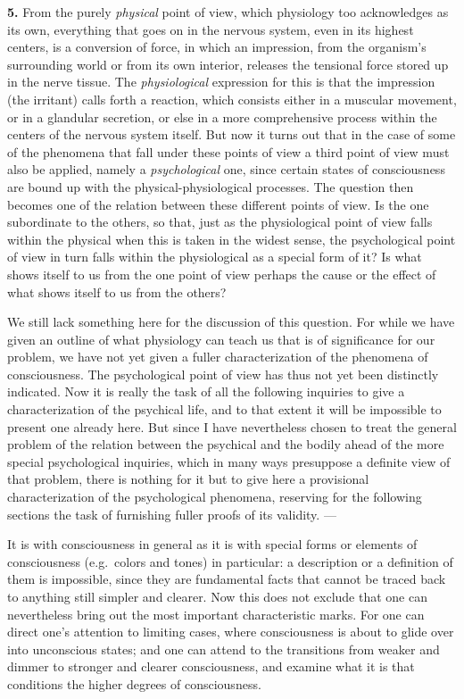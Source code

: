 \documentclass[12pt,a4paper]{book}
\newcommand{\opage}[1]{\marginnote{\footnotesize\textit{[#1]}}}
\begin{document}
\opage{54}\textbf{5.} From the purely \emph{physical} point of view,
which physiology too acknowledges as its own, everything that goes on in
the nervous system, even in its highest centers, is a conversion of
force, in which an impression, from the organism's surrounding world or
from its own interior, releases the tensional force stored up in the
nerve tissue. The \emph{physiological} expression for this is that the
impression (the irritant) calls forth a reaction, which consists either
in a muscular movement, or in a glandular secretion, or else in a more
comprehensive process within the centers of the nervous system itself.
But now it turns out that in the case of some of the phenomena that fall
under these points of view a third point of view must also be applied,
namely a \emph{psychological} one, since certain states of consciousness
are bound up with the physical-physiological processes. The question
then becomes one of the relation between these different points of
view. Is the one subordinate to the others, so that, just as the
physiological point of view falls within the physical when this is
taken in the widest sense, the psychological point of view in turn falls
within the physiological as a special form of it? Is what shows itself
to us from the one point of view perhaps the cause or the effect of what
shows itself to us from the others?

We still lack something here for the discussion of this question. For
while we have given an outline of what physiology can teach us that is
of significance for our problem, we have not yet given a fuller
characterization of the phenomena of consciousness. The psychological
point of view has thus not yet been distinctly indicated. Now it is
really the task of all the following inquiries to give a
characterization of the psychical life, and to that extent it will be
impossible to present one already here. But since I have nevertheless
chosen to treat the general problem of the relation between the
psychical and the bodily ahead of the more special psychological
inquiries, which in many ways presuppose a definite view of that
problem, there is nothing for it but to give here a provisional
characterization of the psychological phenomena, reserving for the
following sections the task of furnishing fuller proofs of its
validity. ---

It is with consciousness in general as it is with special forms or
elements of consciousness (e.g.\ colors and tones) in particular: a
description or a
\opage{55}definition of them is impossible, since they are fundamental
facts that cannot be traced back to anything still simpler and clearer.
Now this does not exclude that one can nevertheless bring out the most
important characteristic marks. For one can direct one's attention to
limiting cases, where consciousness is about to glide over into
unconscious states; and one can attend to the transitions from weaker
and dimmer to stronger and clearer consciousness, and examine what it is
that conditions the higher degrees of consciousness.
\end{document}
